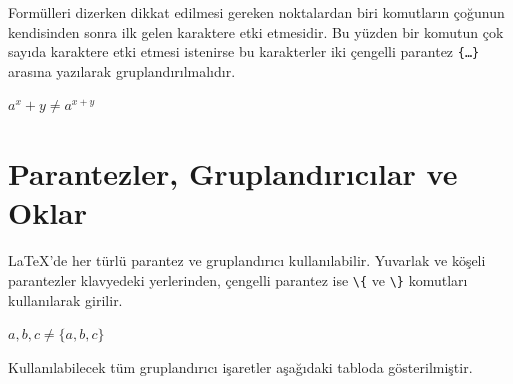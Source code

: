 \documentclass[
  10pt,
]{scrbook}
\newenvironment{Shaded}{\begin{snugshade}}{\end{snugshade}}
\newcommand{\SpecialCharTok}[1]{\textcolor[rgb]{0.00,0.00,0.00}{#1}}
\newcommand{\SpecialStringTok}[1]{\textcolor[rgb]{0.31,0.60,0.02}{#1}}
\theoremstyle{definition}
\theoremstyle{definition}
\theoremstyle{definition}
\theoremstyle{definition}
\theoremstyle{remark}
\begin{document}
Formülleri dizerken dikkat edilmesi gereken noktalardan biri komutların çoğunun kendisinden sonra ilk gelen karaktere etki etmesidir. Bu yüzden bir komutun çok sayıda karaktere etki etmesi istenirse bu karakterler iki çengelli parantez \texttt{\{…\}} arasına yazılarak gruplandırılmalıdır.

\begin{Shaded}
\end{Shaded}

\(a^x+y \neq a^{x+y}\)

\hypertarget{parantezler-gruplandux131rux131cux131lar-ve-oklar}{%
\section{Parantezler, Gruplandırıcılar ve Oklar}\label{parantezler-gruplandux131rux131cux131lar-ve-oklar}}

LaTeX'de her türlü parantez ve gruplandırıcı kullanılabilir. Yuvarlak ve köşeli parantezler klavyedeki yerlerinden, çengelli parantez ise \texttt{\textbackslash{}\{} ve \texttt{\textbackslash{}\}} komutları kullanılarak girilir.

\begin{Shaded}
\end{Shaded}

\({a,b,c}\neq\{a,b,c\}\)

Kullanılabilecek tüm gruplandırıcı işaretler aşağıdaki tabloda gösterilmiştir.
\end{document}
